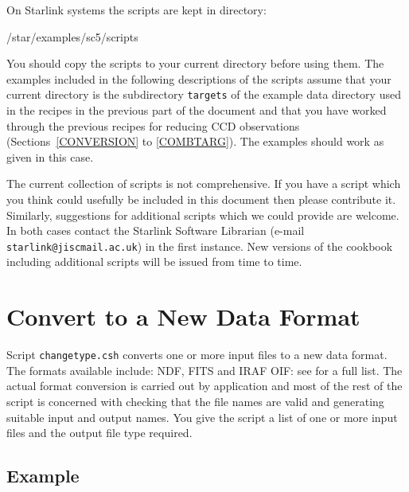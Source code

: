 \documentclass[twoside,11pt]{starlink}
\begin{document}
On Starlink systems the scripts are kept in directory:

\begin{terminalv}
/star/examples/sc5/scripts
\end{terminalv}

You should copy the scripts to your current directory before using them.
The examples included in the following descriptions of the scripts
assume that your current directory is the subdirectory \texttt{targets}
of the example data directory used in the recipes in the previous part
of the document and that you have worked through the previous recipes
for reducing CCD observations (Sections~\ref{CONVERSION} to \ref{COMBTARG}).
The examples should work as given in this case.

The current collection of scripts is not comprehensive.  If you have a
script which you think could usefully be included in this document then
please contribute it.  Similarly, suggestions for additional scripts which
we could provide are welcome.  In both cases contact the Starlink Software
Librarian (e-mail \texttt{starlink@jiscmail.ac.uk}) in the first instance.  New
versions of the cookbook including additional scripts will be issued from
time to time.


\newpage
\section{\label{CHANGETYPE}Convert to a New Data Format}

Script \texttt{changetype.csh} converts one or more input files to a new
data format.  The formats available include: NDF, FITS and IRAF OIF:
see \/\cite{SUN55} for a full list.  The actual
format conversion is carried out by  application
 and most of the rest of the script is
concerned with checking that the file names are valid and generating
suitable input and output names.  You give the script a list of one or more
input files and the output file type required.

\subsection*{Example}
\end{document}

